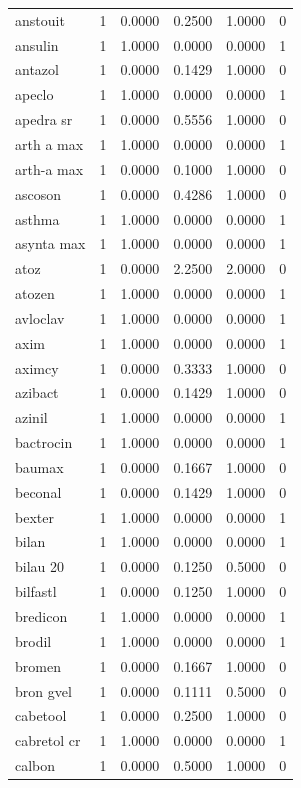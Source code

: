 \begin{longtable}{p{3.0cm}rrrrr}
anstouit & 1 & 0.0000 & 0.2500 & 1.0000 & 0 \\
ansulin & 1 & 1.0000 & 0.0000 & 0.0000 & 1 \\
antazol & 1 & 0.0000 & 0.1429 & 1.0000 & 0 \\
apeclo & 1 & 1.0000 & 0.0000 & 0.0000 & 1 \\
apedra sr & 1 & 0.0000 & 0.5556 & 1.0000 & 0 \\
arth a max & 1 & 1.0000 & 0.0000 & 0.0000 & 1 \\
arth-a max & 1 & 0.0000 & 0.1000 & 1.0000 & 0 \\
ascoson & 1 & 0.0000 & 0.4286 & 1.0000 & 0 \\
asthma & 1 & 1.0000 & 0.0000 & 0.0000 & 1 \\
asynta max & 1 & 1.0000 & 0.0000 & 0.0000 & 1 \\
atoz & 1 & 0.0000 & 2.2500 & 2.0000 & 0 \\
atozen & 1 & 1.0000 & 0.0000 & 0.0000 & 1 \\
avloclav & 1 & 1.0000 & 0.0000 & 0.0000 & 1 \\
axim & 1 & 1.0000 & 0.0000 & 0.0000 & 1 \\
aximcy & 1 & 0.0000 & 0.3333 & 1.0000 & 0 \\
azibact & 1 & 0.0000 & 0.1429 & 1.0000 & 0 \\
azinil & 1 & 1.0000 & 0.0000 & 0.0000 & 1 \\
bactrocin & 1 & 1.0000 & 0.0000 & 0.0000 & 1 \\
baumax & 1 & 0.0000 & 0.1667 & 1.0000 & 0 \\
beconal & 1 & 0.0000 & 0.1429 & 1.0000 & 0 \\
bexter & 1 & 1.0000 & 0.0000 & 0.0000 & 1 \\
bilan & 1 & 1.0000 & 0.0000 & 0.0000 & 1 \\
bilau 20 & 1 & 0.0000 & 0.1250 & 0.5000 & 0 \\
bilfastl & 1 & 0.0000 & 0.1250 & 1.0000 & 0 \\
bredicon & 1 & 1.0000 & 0.0000 & 0.0000 & 1 \\
brodil & 1 & 1.0000 & 0.0000 & 0.0000 & 1 \\
bromen & 1 & 0.0000 & 0.1667 & 1.0000 & 0 \\
bron gvel & 1 & 0.0000 & 0.1111 & 0.5000 & 0 \\
cabetool & 1 & 0.0000 & 0.2500 & 1.0000 & 0 \\
cabretol cr & 1 & 1.0000 & 0.0000 & 0.0000 & 1 \\
calbon & 1 & 0.0000 & 0.5000 & 1.0000 & 0 \\

\end{longtable}
